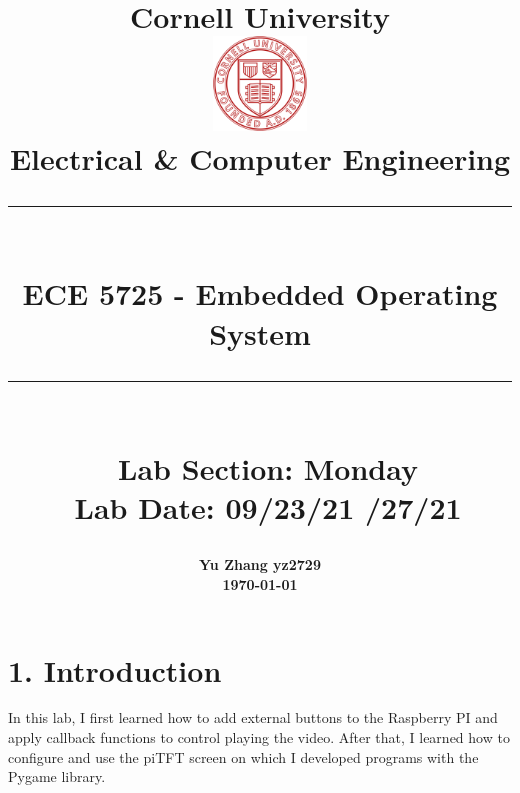 \documentclass[12pt]{report}
\newcommand{\HRule}[1]{\rule{\linewidth}{#1}}
\begin{document}
\date{}

\title{ \normalsize {\textbf{Cornell University}}
		\\ [1.0cm]
		\includegraphics[width=25mm]{img/cornell_logo.png}\\[.5cm]
		Electrical & Computer Engineering \\
		\HRule{2pt} \\
		\LARGE \textbf{ ECE 5725 - Embedded Operating System} \\%
		\LARGE {}
		\HRule{2pt} \\ [0.5cm]
		\normalsize \ {Lab Section: \textbf{Monday} }\\
		\normalsize \ {Lab Date: 09/23/21 /27/21} \vspace*{5\baselineskip}\\
		}
		
\author{
		{ \textbf{Yu Zhang \quad yz2729}}\\[5cm]
		\large {\textbf{\today} } 
		}
		

\maketitle

\section*{1. Introduction\vspace{-1em}}
In this lab, I first learned how to add external buttons to the Raspberry PI and apply callback functions to control playing the video. After that, I learned how to configure and use the piTFT screen on which I developed programs with the Pygame library.\vspace{-1em} 
\end{document}
